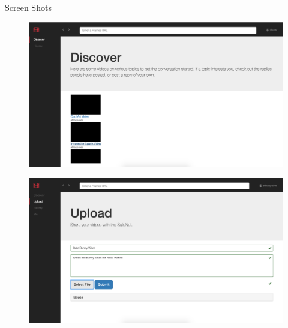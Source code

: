 \documentclass[final]{beamer}
\newlength{\onecolwid}
\newlength{\twocolwid}
\begin{document}
\begin{frame}[t]
\begin{columns}[t]
\begin{column}{\twocolwid}
\begin{columns}[t,totalwidth=\twocolwid]
\begin{column}{\onecolwid}
\begin{block}{}
\end{block}

\begin{block}{Screen Shots}

  \begin{figure}
  \includegraphics[width=0.8\linewidth]{discover-page.png}
  \captionsetup{labelformat=empty}
  \label{fig:discover-page}
  \end{figure}

  \begin{figure}
  \includegraphics[width=0.8\linewidth]{upload-page.png}
  \captionsetup{labelformat=empty}
  \label{fig:upload-page}
  \end{figure}

\end{block}

\end{column} %

\end{columns} %


\begin{columns}[t,totalwidth=\twocolwid] %



\end{columns}
\end{column}
\end{columns}
\end{frame}
\end{document}
